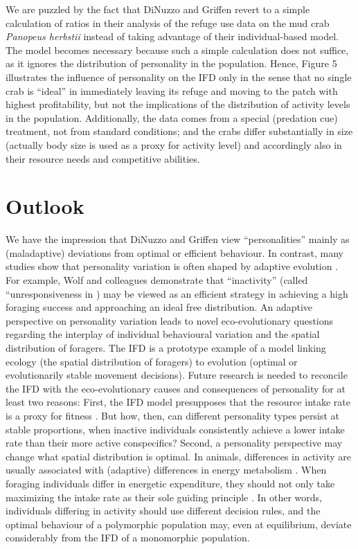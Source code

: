 \begin{refsection}
	We are puzzled by the fact that DiNuzzo and Griffen revert to a simple calculation of ratios in their analysis of the refuge use data on the mud crab \textit{Panopeus herbstii} \citep{toscano2014} instead of taking advantage of their individual-based model.
	The model becomes necessary because such a simple calculation does not suffice, as it ignores the distribution of personality in the population.
	Hence, Figure 5 illustrates the influence of personality on the IFD only in the sense that no single crab is ``ideal'' in immediately leaving its refuge and moving to the patch with highest profitability, but not the implications of the distribution of activity levels in the population.
	Additionally, the data comes from a special (predation cue) treatment, not from standard conditions; and the crabs differ substantially in size (actually body size is used as a proxy for activity level) and accordingly also in their resource needs and competitive abilities. 
	
	\section*{Outlook}
	
	We have the impression that DiNuzzo and Griffen view ``personalities'' mainly as (maladaptive) deviations from optimal or efficient behaviour. In contrast, many studies show that personality variation is often shaped by adaptive evolution \citep{dall2004,wolf2007a,dingemanse2010,wolf2010,luttbegbarney2010,bergmuller2010,wolf2012}.
	For example, Wolf and colleagues \citep{wolf2008a} demonstrate that “inactivity” (called “unresponsiveness in \citep{wolf2008a}) may be viewed as an efficient strategy in achieving a high foraging success and approaching an ideal free distribution.
	An adaptive perspective on personality variation leads to novel eco-evolutionary questions regarding the interplay of individual behavioural variation and the spatial distribution of foragers.
	The IFD is a prototype example of a model linking ecology (the spatial distribution of foragers) to evolution (optimal or evolutionarily stable movement decisions).
	Future research is needed to reconcile the IFD with the eco-evolutionary causes and consequences of personality for at least two reasons: First, the IFD model presupposes that the resource intake rate is a proxy for fitness \citep{tregenza1995}.
	But how, then, can different personality types persist at stable proportions, when inactive individuals consistently achieve a lower intake rate than their more active conspecifics? 
	Second, a personality perspective may change what spatial distribution is optimal.
	In animals, differences in activity are usually associated with (adaptive) differences in energy metabolism \citep{careau2008}.
	When foraging individuals differ in energetic expenditure, they should not only take maximizing the intake rate as their sole guiding principle \citep{campos-candela2019}.
	In other words, individuals differing in activity should use different decision rules, and the optimal behaviour of a polymorphic population may, even at equilibrium, deviate considerably from the IFD of a monomorphic population.


\end{refsection}
